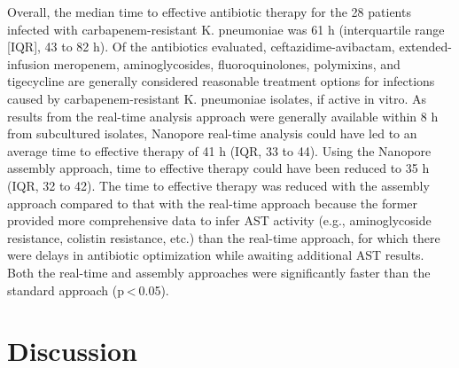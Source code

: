 Overall, the median time to effective antibiotic therapy for the 28 patients infected with carbapenem-resistant K. pneumoniae was 61 h (interquartile range [IQR], 43 to 82 h). Of the antibiotics evaluated, ceftazidime-avibactam, extended-infusion meropenem, aminoglycosides, fluoroquinolones, polymixins, and tigecycline are generally considered reasonable treatment options for infections caused by carbapenem-resistant K. pneumoniae isolates, if active in vitro. As results from the real-time analysis approach were generally available within 8 h from subcultured isolates, Nanopore real-time analysis could have led to an average time to effective therapy of 41 h (IQR, 33 to 44). Using the Nanopore assembly approach, time to effective therapy could have been reduced to 35 h (IQR, 32 to 42). The time to effective therapy was reduced with the assembly approach compared to that with the real-time approach because the former provided more comprehensive data to infer AST activity (e.g., aminoglycoside resistance, colistin resistance, etc.) than the real-time approach, for which there were delays in antibiotic optimization while awaiting additional AST results. Both the real-time and assembly approaches were significantly faster than the standard approach (p < 0.05).

\section{Discussion}
\label{sec:discuss}

